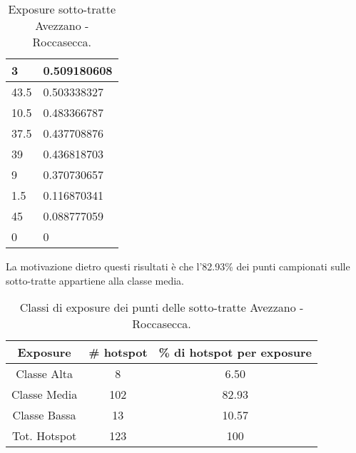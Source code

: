 \begin{table}[H]
\begin{tabular}{|l|l|}
		\rowcolor[HTML]{F8FF00} 
		3                                                         & 0.509180608                                                    \\ \hline
		\rowcolor[HTML]{F8FF00} 
		43.5                                                      & 0.503338327                                                    \\ \hline
		\rowcolor[HTML]{F8FF00} 
		10.5                                                      & 0.483366787                                                    \\ \hline
		\rowcolor[HTML]{F8FF00} 
		37.5                                                      & 0.437708876                                                    \\ \hline
		\rowcolor[HTML]{F8FF00} 
		39                                                        & 0.436818703                                                    \\ \hline
		\rowcolor[HTML]{F8FF00} 
		9                                                         & 0.370730657                                                    \\ \hline
		\rowcolor[HTML]{32CB00} 
		1.5                                                       & 0.116870341                                                    \\ \hline
		\rowcolor[HTML]{32CB00} 
		45                                                        & 0.088777059                                                    \\ \hline
		\rowcolor[HTML]{32CB00} 
		0                                                         & 0                                                              \\ \hline
	\end{tabular}
	\caption{Exposure sotto-tratte Avezzano - Roccasecca.}
	\label{exposure_avezzano_roccasecca}
\end{table}

La motivazione dietro questi risultati è che l'82.93\% dei punti campionati sulle sotto-tratte appartiene alla classe media.

\begin{table}[H]
	\centering
	\begin{tabular}{|c|c|c|}
		\hline
		\rowcolor[HTML]{C0C0C0} 
		\textbf{Exposure} & \textbf{\# hotspot} & \textbf{\% di hotspot per exposure} \\ \hline
		Classe Alta       & 8                  & 6.50                                   \\ \hline
		Classe Media      & 102                 & 82.93                         \\ \hline
		Classe Bassa      & 13              & 10.57                              \\ \hline
		Tot. Hotspot      & 123               & 100                                 \\ \hline
	\end{tabular}
	\caption{Classi di exposure dei punti delle sotto-tratte Avezzano - Roccasecca.}
	\label{risultati_avezzano_roccasecca}
\end{table}

